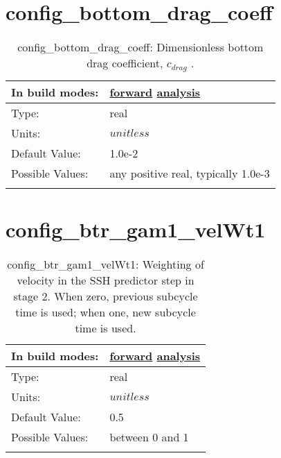 \section[config\_bottom\_drag\_coeff]{config\_bottom\_drag\_coeff}
\label{sec:nm_sec_config_bottom_drag_coeff}
\begin{center}
\begin{longtable}{| p{2.0in} || p{4.0in} |}
    \hline
    In build modes: & \hyperref[subsec:forward_nm_tab_bottom_drag]{forward} \hyperref[subsec:analysis_nm_tab_bottom_drag]{analysis} \\
    \hline
    Type: & real \\
    \hline
    Units: & $unitless$ \\
    \hline
    Default Value: & 1.0e-2 \\
    \hline
    Possible Values: & any positive real, typically 1.0e-3 \\
    \hline
    \caption{config\_bottom\_drag\_coeff:  Dimensionless bottom drag coefficient,  $c_{drag}$ .}
\end{longtable}
\end{center}
\section[config\_btr\_gam1\_velWt1]{config\_btr\_gam1\_velWt1}
\label{sec:nm_sec_config_btr_gam1_velWt1}
\begin{center}
\begin{longtable}{| p{2.0in} || p{4.0in} |}
    \hline
    In build modes: & \hyperref[subsec:forward_nm_tab_split_explicit_ts]{forward} \hyperref[subsec:analysis_nm_tab_split_explicit_ts]{analysis} \\
    \hline
    Type: & real \\
    \hline
    Units: & $unitless$ \\
    \hline
    Default Value: & 0.5 \\
    \hline
    Possible Values: & between 0 and 1 \\
    \hline
    \caption{config\_btr\_gam1\_velWt1: Weighting of velocity in the SSH predictor step in stage 2.  When zero, previous subcycle time is used; when one, new subcycle time is used.}
\end{longtable}
\end{center}
